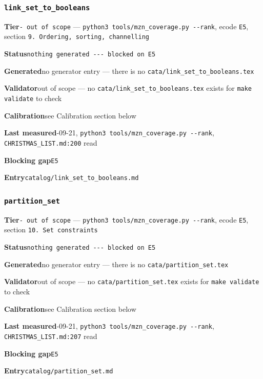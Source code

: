 \documentclass[10pt,a4paper]{article}
\newcommand{\entryfield}[2]{{\raggedright\textbf{#1}\quad #2\par}}
\begin{document}
\subsubsection*{\texttt{link\_\allowbreak{}set\_\allowbreak{}to\_\allowbreak{}booleans}}
\label{entry:link-set-to-booleans}
\entryfield{Tier}{\texttt{- out of scope} --- \texttt{python3 tools/\allowbreak{}mzn\_\allowbreak{}coverage.\allowbreak{}py -\allowbreak{}-\allowbreak{}rank}, ecode \texttt{E5}, section \texttt{9.\allowbreak{} Ordering, sorting, channelling}}
\entryfield{Status}{\texttt{nothing generated -\allowbreak{}-\allowbreak{}-\allowbreak{} blocked on E5}}
\entryfield{Generated}{no generator entry --- there is no \texttt{cata/\allowbreak{}link\_\allowbreak{}set\_\allowbreak{}to\_\allowbreak{}booleans.\allowbreak{}tex}}
\entryfield{Validator}{out of scope --- no \texttt{cata/\allowbreak{}link\_\allowbreak{}set\_\allowbreak{}to\_\allowbreak{}booleans.\allowbreak{}tex} exists for \texttt{make validate} to check}
\entryfield{Calibration}{see Calibration section below}
\entryfield{Last measured}{2026-09-21, \texttt{python3 tools/\allowbreak{}mzn\_\allowbreak{}coverage.\allowbreak{}py -\allowbreak{}-\allowbreak{}rank}, \texttt{CHRISTMAS\_LIST.md:200} read}
\entryfield{Blocking gap}{\texttt{E5}}
\entryfield{Entry}{\texttt{catalog/link\_set\_to\_booleans.md}}
\subsubsection*{\texttt{partition\_\allowbreak{}set}}
\label{entry:partition-set}
\entryfield{Tier}{\texttt{- out of scope} --- \texttt{python3 tools/\allowbreak{}mzn\_\allowbreak{}coverage.\allowbreak{}py -\allowbreak{}-\allowbreak{}rank}, ecode \texttt{E5}, section \texttt{10. Set constraints}}
\entryfield{Status}{\texttt{nothing generated -\allowbreak{}-\allowbreak{}-\allowbreak{} blocked on E5}}
\entryfield{Generated}{no generator entry --- there is no \texttt{cata/partition\_set.tex}}
\entryfield{Validator}{out of scope --- no \texttt{cata/partition\_set.tex} exists for \texttt{make validate} to check}
\entryfield{Calibration}{see Calibration section below}
\entryfield{Last measured}{2026-09-21, \texttt{python3 tools/\allowbreak{}mzn\_\allowbreak{}coverage.\allowbreak{}py -\allowbreak{}-\allowbreak{}rank}, \texttt{CHRISTMAS\_LIST.md:207} read}
\entryfield{Blocking gap}{\texttt{E5}}
\entryfield{Entry}{\texttt{catalog/partition\_set.md}}
\end{document}
